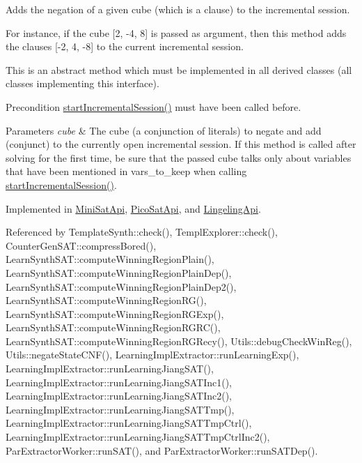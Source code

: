 Adds the negation of a given cube (which is a clause) to the incremental session. 

For instance, if the cube \mbox{[}2, -\/4, 8\mbox{]} is passed as argument, then this method adds the clauses \mbox{[}-\/2, 4, -\/8\mbox{]} to the current incremental session.

This is an abstract method which must be implemented in all derived classes (all classes implementing this interface).

\begin{DoxyPrecond}{Precondition}
\hyperlink{classSatSolver_a74603f84c3f2383a5fc44d5a8093cbea}{start\-Incremental\-Session()} must have been called before. 
\end{DoxyPrecond}

\begin{DoxyParams}{Parameters}
{\em cube} & The cube (a conjunction of literals) to negate and add (conjunct) to the currently open incremental session. If this method is called after solving for the first time, be sure that the passed cube talks only about variables that have been mentioned in vars\-\_\-to\-\_\-keep when calling \hyperlink{classSatSolver_a74603f84c3f2383a5fc44d5a8093cbea}{start\-Incremental\-Session()}. \\
\hline
\end{DoxyParams}


Implemented in \hyperlink{classMiniSatApi_a49afe5c41bb036a31f65f98621e82846}{Mini\-Sat\-Api}, \hyperlink{classPicoSatApi_ace9bfbd0c8cbd62c3e92d2b208bb7b66}{Pico\-Sat\-Api}, and \hyperlink{classLingelingApi_afefd24f97e49aed7cbaf25140a6b7741}{Lingeling\-Api}.



Referenced by Template\-Synth\-::check(), Templ\-Explorer\-::check(), Counter\-Gen\-S\-A\-T\-::compress\-Bored(), Learn\-Synth\-S\-A\-T\-::compute\-Winning\-Region\-Plain(), Learn\-Synth\-S\-A\-T\-::compute\-Winning\-Region\-Plain\-Dep(), Learn\-Synth\-S\-A\-T\-::compute\-Winning\-Region\-Plain\-Dep2(), Learn\-Synth\-S\-A\-T\-::compute\-Winning\-Region\-R\-G(), Learn\-Synth\-S\-A\-T\-::compute\-Winning\-Region\-R\-G\-Exp(), Learn\-Synth\-S\-A\-T\-::compute\-Winning\-Region\-R\-G\-R\-C(), Learn\-Synth\-S\-A\-T\-::compute\-Winning\-Region\-R\-G\-Recy(), Utils\-::debug\-Check\-Win\-Reg(), Utils\-::negate\-State\-C\-N\-F(), Learning\-Impl\-Extractor\-::run\-Learning\-Exp(), Learning\-Impl\-Extractor\-::run\-Learning\-Jiang\-S\-A\-T(), Learning\-Impl\-Extractor\-::run\-Learning\-Jiang\-S\-A\-T\-Inc1(), Learning\-Impl\-Extractor\-::run\-Learning\-Jiang\-S\-A\-T\-Inc2(), Learning\-Impl\-Extractor\-::run\-Learning\-Jiang\-S\-A\-T\-Tmp(), Learning\-Impl\-Extractor\-::run\-Learning\-Jiang\-S\-A\-T\-Tmp\-Ctrl(), Learning\-Impl\-Extractor\-::run\-Learning\-Jiang\-S\-A\-T\-Tmp\-Ctrl\-Inc2(), Par\-Extractor\-Worker\-::run\-S\-A\-T(), and Par\-Extractor\-Worker\-::run\-S\-A\-T\-Dep().

